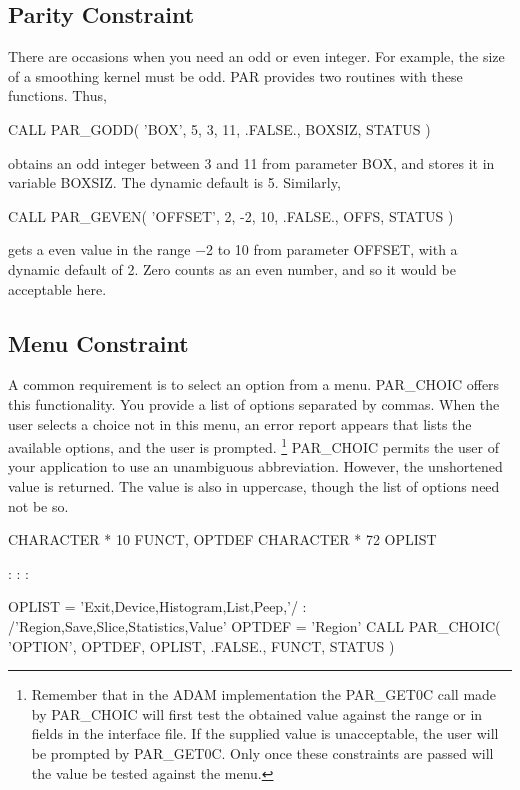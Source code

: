 \documentclass[twoside,11pt,nolof]{starlink}
\begin{document}
\subsection{Parity Constraint}

There are occasions when you need an odd or even integer.  For example,
the size of a smoothing kernel must be odd.  PAR provides two routines
with these functions.  Thus,

\begin{terminalv}
      CALL PAR_GODD( 'BOX', 5, 3, 11, .FALSE., BOXSIZ, STATUS )
\end{terminalv}

obtains an odd integer between 3 and 11 from parameter BOX, and stores
it in variable BOXSIZ.  The dynamic default is 5.  Similarly,

\begin{terminalv}
      CALL PAR_GEVEN( 'OFFSET', 2, -2, 10, .FALSE., OFFS, STATUS )
\end{terminalv}
gets a even value in the range $-$2 to 10 from parameter OFFSET, with a
dynamic default of 2.  Zero counts as an even number, and so it would be
acceptable here.

\subsection{Menu Constraint}

A common requirement is to select an option from a menu.  PAR\_CHOIC
offers this functionality.   You provide a list of options separated by
commas.  When the user selects a choice not in this menu, an error
report appears that lists the available options, and the user is
prompted. \footnote{Remember that in the ADAM implementation the PAR\_GET0C
call made by PAR\_CHOIC will first test the obtained value against the
range or in fields in the interface file.  If the supplied value is
unacceptable, the user will be prompted by PAR\_GET0C.  Only once these
constraints are passed will the value be tested against the menu.}
PAR\_CHOIC permits the user of your application to use an unambiguous
abbreviation.  However, the unshortened value is returned.  The value is
also in uppercase, though the list of options need not be so.

\begin{terminalv}
      CHARACTER * 10 FUNCT, OPTDEF
      CHARACTER * 72 OPLIST

          :       :       :

      OPLIST = 'Exit,Device,Histogram,List,Peep,'/
     :         /'Region,Save,Slice,Statistics,Value'
      OPTDEF = 'Region'
      CALL PAR_CHOIC( 'OPTION', OPTDEF, OPLIST, .FALSE., FUNCT, STATUS )
\end{terminalv}
\end{document}

